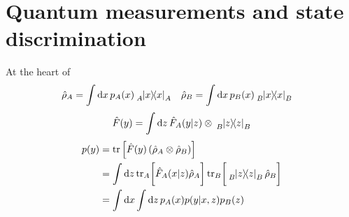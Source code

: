 \section{Quantum measurements and state discrimination}

At the heart of 
\begin{align}
	\hat\rho_A
	&=
	\int\dd{x}p_A(x)
	\tensor[_A]{\ketbra{x}}{_A}
	&
	\hat\rho_B
	&=
	\int\dd{x}p_B(x)
	\tensor[_B]{\ketbra{x}}{_B}
\end{align}
\begin{equation}
	\hat{F}(y)
	=
	\int\dd{z}
	\hat{F}_A(y\vert z)
	\otimes
	\tensor[_B]{\ketbra{z}}{_B}
\end{equation}
\begin{equation}
	\begin{split}
		p(y)
		&=
		\tr\left[
			\hat{F}(y)
			\left(\hat\rho_A\otimes\hat\rho_B\right)
		\right]
		\\
		&=
		\int\dd{z}
		\tr_A\biggl[
			\hat{F}_A(x\vert z)
			\hat\rho_A
		\biggr]
		\tr_B\biggl[
			\tensor[_B]{\ketbra{z}}{_B}
			\hat\rho_B
		\biggr]
		\\
		&=
		\int\dd{x}
		\int\dd{z}
		p_A(x)
		p(y\vert x,z)
		p_B(z)		
	\end{split}
\end{equation}